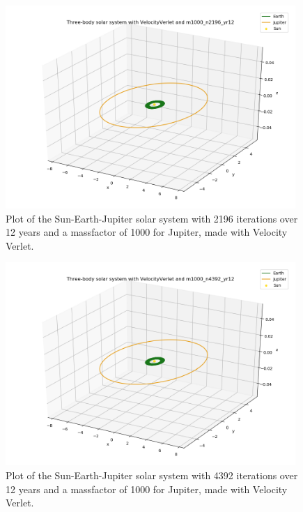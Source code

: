 \documentclass{article}
\begin{document}
    \begin{figure}[H]
        \centering
        \includegraphics[width = 11cm]{img/plot3D_S_E_J_V_m1000_n2196_yr12.png}
        \caption{Plot of the Sun-Earth-Jupiter solar system with 2196 iterations over 12 years and a massfactor of 1000 for Jupiter, made with Velocity Verlet.}
        \label{fig:plot3D_S_E_J_V_m1000_n2196_yr12}
    \end{figure}

    \begin{figure}[H]
        \centering
        \includegraphics[width = 11cm]{img/plot3D_S_E_J_V_m1000_n4392_yr12.png}
        \caption{Plot of the Sun-Earth-Jupiter solar system with 4392 iterations over 12 years and a massfactor of 1000 for Jupiter, made with Velocity Verlet.}
        \label{fig:plot3D_S_E_J_V_m1000_n4392_yr12}
    \end{figure}
\end{document}
